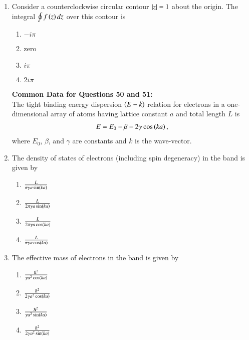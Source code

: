 \documentclass[journal]{IEEEtran}
\begin{document}
\begin{enumerate}
    \item Consider a counterclockwise circular contour $\left\vert z\right\vert = 1$ about the origin. The integral
    $\oint f\left(z\right) dz$ over this contour is
    \begin{multicols}{4}
        \begin{enumerate}
            \item $-i\pi$
            \item zero
            \item $i\pi$
            \item $2i\pi$
        \end{enumerate}
    \end{multicols}

    \textbf{Common Data for Questions 50 and 51:} \\
    The tight binding energy dispersion $\left(E-k\right)$ relation for electrons in a one-dimensional
    array of atoms having lattice constant $a$ and total length $L$ is 
    \begin{align*}    
    E = E_0 - \beta - 2\gamma \cos\left(ka\right),
    \end{align*}
    where $E_0$, $\beta$, and $\gamma$ are constants and $k$ is the wave-vector.

    \item The density of states of electrons (including spin degeneracy) in the band is given by
    \begin{multicols}{4}
        \begin{enumerate}
            \item $\frac{L}{\pi \gamma a \sin\left(ka\right)}$
            \item $\frac{L}{2\pi \gamma a \sin\left(ka\right)}$
            \item $\frac{L}{2\pi \gamma a \cos\left(ka\right)}$
            \item $\frac{L}{\pi \gamma a \cos\left(ka\right)}$
        \end{enumerate}
    \end{multicols}
    
    \item The effective mass of electrons in the band is given by
    \begin{multicols}{4}
        \begin{enumerate}
            \item $\frac{\hbar^2}{\gamma a^2 \cos\left(ka\right)}$
            \item $\frac{\hbar^2}{2\gamma a^2 \cos\left(ka\right)}$
            \item $\frac{\hbar^2}{\gamma a^2 \sin\left(ka\right)}$
            \item $\frac{\hbar^2}{2\gamma a^2 \sin\left(ka\right)}$
        \end{enumerate}
    \end{multicols}


\end{enumerate}
\end{document}
